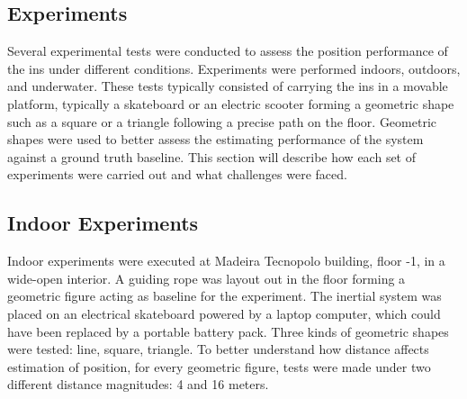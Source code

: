 \newpage




\subsection{Experiments}
\label{sub:experiments}

Several experimental tests were conducted to assess the position performance of the \acrshort{ins} under different conditions. Experiments were performed indoors, outdoors, and underwater. These tests typically consisted of carrying the \acrshort{ins} in a movable platform, typically a skateboard or an electric scooter forming a geometric shape such as a square or a triangle following a precise path on the floor. Geometric shapes were used to better assess the estimating performance of the system against a ground truth baseline. This section will describe how each set of experiments were carried out and what challenges were faced.

\subsection{Indoor Experiments}

Indoor experiments were executed at Madeira Tecnopolo building, floor -1, in a wide-open interior. A guiding rope was layout out in the floor forming a geometric figure acting as baseline for the experiment. The inertial system was placed on an electrical skateboard powered by a laptop computer, which could have been replaced by a portable battery pack. Three kinds of geometric shapes were tested: line, square, triangle. To better understand how distance affects estimation of position, for every geometric figure, tests were made under two different distance magnitudes: 4 and 16 meters.

